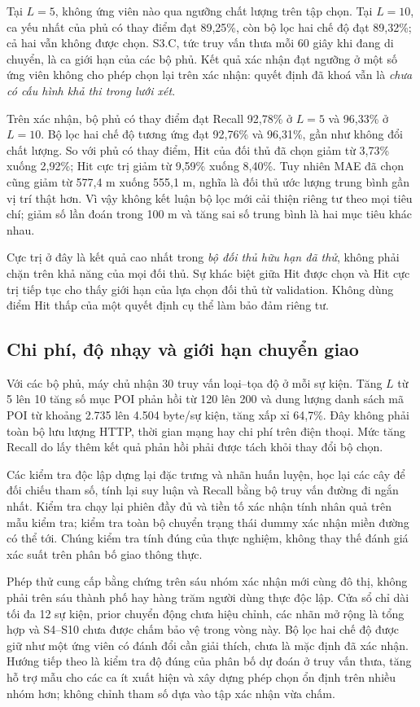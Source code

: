 Tại $L=5$, không ứng viên nào qua ngưỡng chất lượng trên tập chọn. Tại $L=10$, ca yếu nhất của phủ có thay điểm đạt 89,25\%, còn bộ lọc hai chế độ đạt 89,32\%; cả hai vẫn không được chọn. S3.C, tức truy vấn thưa mỗi 60 giây khi đang di chuyển, là ca giới hạn của các bộ phủ. Kết quả xác nhận đạt ngưỡng ở một số ứng viên không cho phép chọn lại trên xác nhận: quyết định đã khoá vẫn là \emph{chưa có cấu hình khả thi trong lưới xét}.

Trên xác nhận, bộ phủ có thay điểm đạt Recall 92,78\% ở $L=5$ và 96,33\% ở $L=10$. Bộ lọc hai chế độ tương ứng đạt 92,76\% và 96,31\%, gần như không đổi chất lượng. So với phủ có thay điểm, Hit của đối thủ đã chọn giảm từ 3,73\% xuống 2,92\%; Hit cực trị giảm từ 9,59\% xuống 8,40\%. Tuy nhiên MAE đã chọn cũng giảm từ 577,4 m xuống 555,1 m, nghĩa là đối thủ ước lượng trung bình gần vị trí thật hơn. Vì vậy không kết luận bộ lọc mới cải thiện riêng tư theo mọi tiêu chí; giảm số lần đoán trong 100 m và tăng sai số trung bình là hai mục tiêu khác nhau.

Cực trị ở đây là kết quả cao nhất trong \emph{bộ đối thủ hữu hạn đã thử}, không phải chặn trên khả năng của mọi đối thủ. Sự khác biệt giữa Hit được chọn và Hit cực trị tiếp tục cho thấy giới hạn của lựa chọn đối thủ từ validation. Không dùng điểm Hit thấp của một quyết định cụ thể làm bảo đảm riêng tư.

\subsection{Chi phí, độ nhạy và giới hạn chuyển giao}

Với các bộ phủ, máy chủ nhận 30 truy vấn loại--tọa độ ở mỗi sự kiện. Tăng $L$ từ 5 lên 10 tăng số mục POI phản hồi từ 120 lên 200 và dung lượng danh sách mã POI từ khoảng 2.735 lên 4.504 byte/sự kiện, tăng xấp xỉ 64,7\%. Đây không phải toàn bộ lưu lượng HTTP, thời gian mạng hay chi phí trên điện thoại. Mức tăng Recall do lấy thêm kết quả phản hồi phải được tách khỏi thay đổi bộ chọn.



Các kiểm tra độc lập dựng lại đặc trưng và nhãn huấn luyện, học lại các cây để đối chiếu tham số, tính lại suy luận và Recall bằng bộ truy vấn đường đi ngắn nhất. Kiểm tra chạy lại phiên đầy đủ và tiền tố xác nhận tính nhân quả trên mẫu kiểm tra; kiểm tra toàn bộ chuyển trạng thái dummy xác nhận miền đường có thể tới. Chúng kiểm tra tính đúng của thực nghiệm, không thay thế đánh giá xác suất trên phân bố giao thông thực.

Phép thử cung cấp bằng chứng trên sáu nhóm xác nhận mới cùng đô thị, không phải trên sáu thành phố hay hàng trăm người dùng thực độc lập. Cửa sổ chỉ dài tối đa 12 sự kiện, prior chuyển động chưa hiệu chỉnh, các nhãn mở rộng là tổng hợp và S4--S10 chưa được chấm bảo vệ trong vòng này. Bộ lọc hai chế độ được giữ như một ứng viên có đánh đổi cần giải thích, chưa là mặc định đã xác nhận. Hướng tiếp theo là kiểm tra độ đúng của phân bố dự đoán ở truy vấn thưa, tăng hỗ trợ mẫu cho các ca ít xuất hiện và xây dựng phép chọn ổn định trên nhiều nhóm hơn; không chỉnh tham số dựa vào tập xác nhận vừa chấm.
